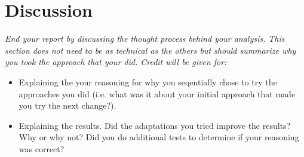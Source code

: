 \documentclass[11pt]{article}
\begin{document}


\section{Discussion} 

{\itshape
End your report by discussing the thought process behind your
analysis. This section does not need to be as technical as the others 
but should summarize why you took the approach that your did. Credit will be given for:

  \begin{itemize}
  \item Explaining the your reasoning for why you seqentially chose to
    try the approaches you did (i.e. what was it about your initial
    approach that made you try the next change?).  
  \item Explaining the results.  Did the adaptations you tried improve
    the results?  Why or why not?  Did you do additional tests to
    determine if your reasoning was correct?  
  \end{itemize}
 }
\end{document}
